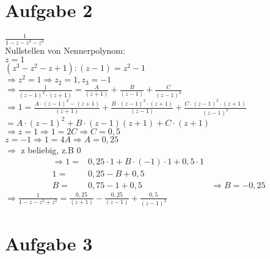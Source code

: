 \documentclass[11pt,a4paper]{article}
\begin{document}
  \section*{Aufgabe 2}

    $\frac{1}{1-z-z^2-z^3}$\\
    Nullstellen von Nennerpolynom:\\
    $z=1$\\
    $(z^3-z^2-z+1) : (z-1)=z^2-1$\\
    $\Rightarrow z^2=1 \Rightarrow z_2=1,z_3=-1$\\
    $\Rightarrow \frac{1}{\left(z-1\right)^2\cdot\left(z+1\right)}=\frac{A}{\left(z+1\right)}+\frac{B}{\left(z-1\right)}+\frac{C}{\left(z-1\right)^2}$\\
    $\Rightarrow 1=\frac{A\cdot \left(z-1\right)^2-\left(z+1\right)}{\left(z+1\right)}+\frac{B\cdot \left(z-1\right)^2\cdot \left(z+1\right)}{\left(z-1\right)}+\frac{C\cdot \left(z-1\right)^2\cdot\left(z+1\right)}{\left(z-1\right)^2}$\\
    $=A\cdot \left(z-1\right)^2+B\cdot\left(z-1\right)\left(z+1\right)+C\cdot\left(z+1\right)$\\
    $\Rightarrow z=1 \Rightarrow 1=2C \Rightarrow C=0,5$\\
    $z=-1 \Rightarrow 1=4A \Rightarrow A=0,25$\\
    $\Rightarrow$ z beliebig, z.B $0$
    \begin{align*}
      \Rightarrow 1 =& 0,25 \cdot 1 + B \cdot \left( -1 \right) \cdot 1 + 0,5 \cdot 1\\
      1 =& 0,25 - B + 0,5\\
      B =& 0,75 - 1 + 0,5 &\Rightarrow B = -0,25
    \end{align*}
    $\Rightarrow \frac{1}{1-z-z^2+z^3} = \frac{0,25}{\left(z+1\right)} - \frac{0,25}{\left(z-1\right)}+ \frac{0,5}{\left(z-1\right)^2}$

  \section*{Aufgabe 3}
\end{document}

